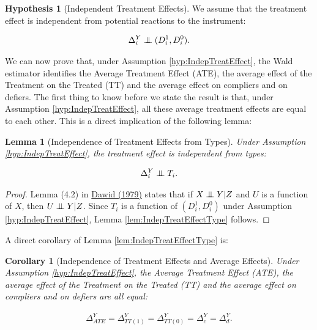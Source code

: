 \documentclass[
]{book}
\newcommand\Ind{\protect\mathpalette{\protect\independenT}{\perp}}
\def\independenT#1#2{\mathrel{\setbox0\hbox{$#1#2$}\copy0\kern-\wd0\mkern4mu\box0}}
\newtheorem{lemma}{Lemma}[chapter]
\newtheorem{corollary}{Corollary}[chapter]
\theoremstyle{definition}
\theoremstyle{definition}
\theoremstyle{definition}
\theoremstyle{definition}
\newtheorem{hypothesis}{Hypothesis}[chapter]
\theoremstyle{remark}
\begin{document}
\begin{hypothesis}[Independent Treatment Effects]
\protect\hypertarget{hyp:IndepTreatEffect}{}{\label{hyp:IndepTreatEffect} \iffalse (Independent Treatment Effects) \fi{} }We assume that the treatment effect is independent from potential reactions to the instrument:

\begin{align*}
\Delta^Y_i\Ind (D^1_i,D^0_i).
\end{align*}
\end{hypothesis}

We can now prove that, under Assumption \ref{hyp:IndepTreatEffect}, the Wald estimator identifies the Average Treatment Effect (ATE), the average effect of the Treatment on the Treated (TT) and the average effect on compliers and on defiers.
The first thing to know before we state the result is that, under Assumption \ref{hyp:IndepTreatEffect}, all these average treatment effects are equal to each other.
This is a direct implication of the following lemma:

\begin{lemma}[Independence of Treatment Effects from Types]
\protect\hypertarget{lem:IndepTreatEffectType}{}{\label{lem:IndepTreatEffectType} \iffalse (Independence of Treatment Effects from Types) \fi{} }Under Assumption \ref{hyp:IndepTreatEffect}, the treatment effect is independent from types:

\begin{align*}
\Delta^Y_i\Ind T_i.
\end{align*}
\end{lemma}

\begin{proof}
\iffalse{} {Proof. } \fi{}Lemma (4.2) in \href{https://rss.onlinelibrary.wiley.com/doi/10.1111/j.2517-6161.1979.tb01052.x}{Dawid (1979)} states that if \(X \Ind Y|Z\) and \(U\) is a function of \(X\), then \(U \Ind Y|Z\).
Since \(T_i\) is a function of \((D^1_i,D^0_i)\) under Assumption \ref{hyp:IndepTreatEffect}, Lemma \ref{lem:IndepTreatEffectType} follows.
\end{proof}

A direct corollary of Lemma \ref{lem:IndepTreatEffectType} is:

\begin{corollary}[Independence of Treatment Effects and Average Effects]
\protect\hypertarget{cor:IndepTreatEffectAve}{}{\label{cor:IndepTreatEffectAve} \iffalse (Independence of Treatment Effects and Average Effects) \fi{} }Under Assumption \ref{hyp:IndepTreatEffect}, the Average Treatment Effect (ATE), the average effect of the Treatment on the Treated (TT) and the average effect on compliers and on defiers are all equal:

\begin{align*}
\Delta^Y_{ATE} = \Delta^Y_{TT(1)} = \Delta^Y_{TT(0)} = \Delta^Y_{c} = \Delta^Y_{d}.
\end{align*}
\end{corollary}
\end{document}
